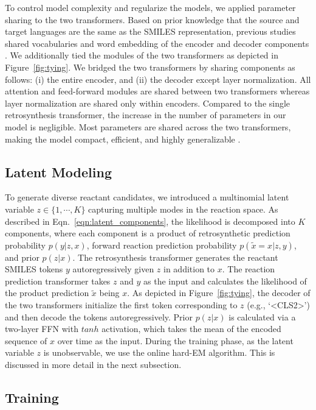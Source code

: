 \documentclass[journal=jacsat,manuscript=article]{achemso}
\begin{document}
	To control model complexity and regularize the models, we applied parameter sharing to the two transformers. Based on prior knowledge that the source and target languages are the same as the SMILES representation, previous studies shared vocabularies and word embedding of the encoder and decoder components \cite{schwaller2019molecular, zheng2019predicting,chen2019learning, karpov2019transformer,lin2020automatic}. We additionally tied the modules of the two transformers as depicted in Figure~\ref{fig:tying}. We bridged the two transformers by sharing components as follows: (i) the entire encoder, and (ii) the decoder except layer normalization. All attention and feed-forward modules are shared between two transformers whereas layer normalization are shared only within encoders. Compared to the single retrosynthesis transformer, the increase in the number of parameters in our model is negligible. Most parameters are shared across the two transformers, making the model compact, efficient, and highly generalizable \cite{xia2019tied}.
	
	
	\subsection{Latent Modeling}


	To generate diverse reactant candidates, we introduced a multinomial latent variable $z\in\{1,\cdots,K\}$ capturing multiple modes in the reaction space. As described in Eqn.~\ref{eqn:latent_components}, the likelihood is decomposed into $K$ components, where each component is a product of retrosynthetic prediction probability $p(y|z,x)$, forward reaction prediction probability $p(\tilde{x}=x|z,y)$, and prior $p(z|x)$. The retrosynthesis transformer generates the reactant SMILES tokens $y$ autoregressively given $z$ in addition to $x$. The reaction prediction transformer takes $z$ and $y$ as the input and calculates the likelihood of the product prediction $\tilde{x}$ being $x$. As depicted in Figure~\ref{fig:tying}, the decoder of the two transformers initialize the first token corresponding to $z$ (e.g., `<CLS2>') and then decode the tokens autoregressively. Prior $p(z|x)$ is calculated via a two-layer FFN with $tanh$ activation, which takes the mean of the encoded sequence of $x$ over time as the input. During the training phase, as the latent variable $z$ is unobservable, we use the online hard-EM algorithm. This is discussed in more detail in the next subsection.

	
	\subsection{Training}
	
\end{document}
